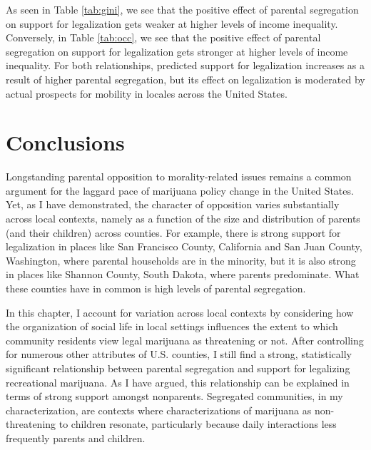 As seen in Table \ref{tab:gini}, we see that the positive effect of parental segregation on support for legalization gets weaker at higher levels of income inequality. Conversely, in Table \ref{tab:occ}, we see that the positive effect of parental segregation on support for legalization gets stronger at higher levels of income inequality. For both relationships, predicted support for legalization increases as a result of higher parental segregation, but its effect on legalization is moderated by actual prospects for mobility in locales across the United States. 






\section{Conclusions}

Longstanding parental opposition to morality-related issues remains a common argument for the laggard pace of marijuana policy change in the United States. 
Yet, as I have demonstrated, the character of opposition varies substantially across local contexts, namely as a function of the size and distribution of parents (and their children) across counties. For example, there is strong support for legalization in places like San Francisco County, California and San Juan County, Washington, where parental households are in the minority, but it is also strong in places like Shannon County, South Dakota, where parents predominate. What these counties have in common is high levels of parental segregation. %

In this chapter, I account for variation across local contexts by considering how the organization of social life in local settings influences the extent to which community residents view legal marijuana as threatening or not. After controlling for numerous other attributes of U.S. counties, I still find a strong, statistically significant relationship between parental segregation and support for legalizing recreational marijuana. As I have argued, this relationship can be explained in terms of strong support amongst nonparents. Segregated communities, in my characterization, are contexts where characterizations of marijuana as non-threatening to children resonate, particularly because daily interactions less frequently parents and children.

